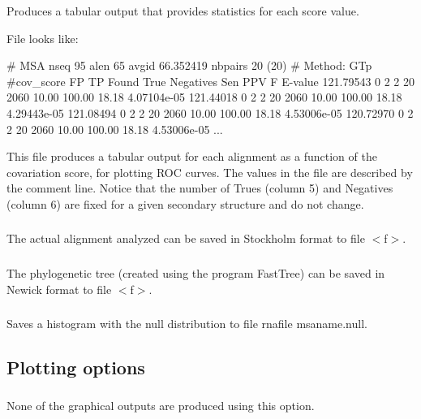 Produces a tabular output that provides statistics for each score value.

File  looks like:

\begin{sreoutput}
# MSA nseq 95 alen 65 avgid 66.352419 nbpairs 20 (20)
# Method: GTp
#cov_score  FP  TP Found  True  Negatives  Sen   PPV     F       E-value
121.79543   0   2  2      20    2060       10.00 100.00  18.18   4.07104e-05
121.44018   0   2  2      20    2060       10.00 100.00  18.18   4.29443e-05
121.08494   0   2  2      20    2060       10.00 100.00  18.18   4.53006e-05
120.72970   0   2  2      20    2060       10.00 100.00  18.18   4.53006e-05
...
\end{sreoutput}

This file produces a tabular output for each alignment as a function
of the covariation score, for plotting ROC curves. The values in the
file are described by the comment line. Notice that the number of
Trues (column 5) and Negatives (column 6) are fixed for a given
secondary structure and do not change.

\subsubsection{} The actual alignment analyzed can be saved in Stockholm format to file $<$f$>$.

\subsubsection{} The phylogenetic tree (created using the program FastTree) can be saved in Newick format to file $<$f$>$.

\subsubsection{} Saves a histogram with the null distribution to file rnafile msaname.null.

\subsection{Plotting options}

\subsubsection{} None of the graphical outputs are produced using this option.


